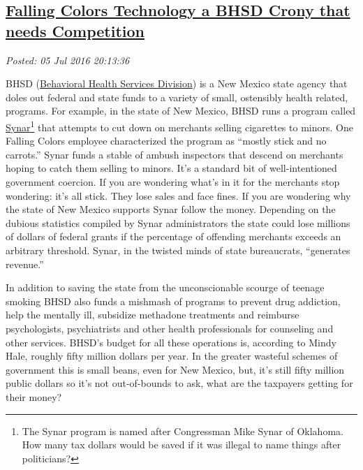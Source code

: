 %

\subsection*{\href{https://analyzethedatanotthedrivel.org/2016/07/05/falling-colors-technology-a-bhsd-crony-that-needs-competition/}{Falling Colors Technology a BHSD Crony that needs Competition}}


\noindent\emph{Posted: 05 Jul 2016 20:13:36}
\vspace{6pt}

BHSD
(\href{http://www.hsd.state.nm.us/Behavioral_health_services_division.aspx}{Behavioral
Health Services Division}) is a New Mexico state agency that doles out
federal and state funds to a variety of small, ostensibly health
related, programs. For example, in the state of New Mexico, BHSD runs a
program called
\href{http://www.samhsa.gov/synar/about}{Synar}\footnote{The Synar program is named after Congressman Mike Synar of Oklahoma.
How many tax dollars would be saved if it was illegal to name things
after politicians?} that attempts to cut down on merchants selling cigarettes to minors. One
Falling Colors employee characterized the program as ``mostly stick and
no carrots.'' Synar funds a stable of ambush inspectors that descend on
merchants hoping to catch them selling to minors. It's a standard bit of
well-intentioned government coercion. If you are wondering what's in it
for the merchants stop wondering: it's all stick. They lose sales and
face fines. If you are wondering why the state of New Mexico supports
Synar follow the money. Depending on the dubious
statistics compiled by Synar
administrators the state could lose millions of dollars of federal
grants if the percentage of offending merchants exceeds an arbitrary
threshold. Synar, in the twisted minds of state bureaucrats, ``generates
revenue.''

In addition to saving the state from the unconscionable scourge of
teenage smoking BHSD also funds a mishmash of programs to prevent drug
addiction, help the mentally ill, subsidize methadone treatments and
reimburse psychologists, psychiatrists and other health professionals
for counseling and other services. BHSD's budget for all these
operations is, according to Mindy Hale, roughly fifty million dollars
per year. In the greater wasteful schemes of government this is small
beans, even for New Mexico, but, it's still fifty million public dollars
so it's not out-of-bounds to ask, what are the taxpayers getting for
their money?

